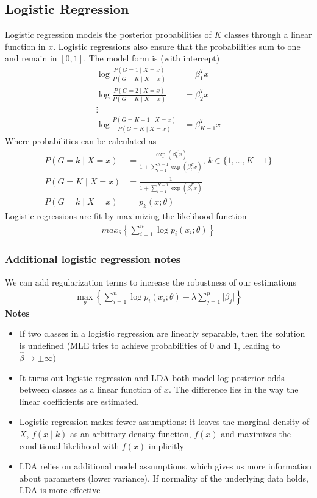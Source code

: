\documentclass{article}
\newcommand{\abs}[1]{\lvert#1\rvert}
\begin{document}
\subsection{Logistic Regression}
Logistic regression models the posterior probabilities of $K$ classes through a linear function in $x$. Logistic regressions also ensure that the probabilities sum to one and remain in $[0,1]$. The model form is (with intercept)
\begin{align*}
  \log\frac{P(G=1 \mid X=x)}{P(G=K \mid X=x)} &= \beta_1^Tx\\
  \log\frac{P(G=2 \mid X=x)}{P(G=K \mid X=x)} &= \beta_2^Tx\\
  \vdots\\
  \log\frac{P(G=K-1 \mid X=x)}{P(G=K \mid X=x)} &= \beta_{K-1}^Tx
\end{align*}
Where probabilities can be calculated as
\begin{align*}
  P(G=k \mid X=x) &= \frac{\exp(\beta_k^Tx)}{1 + \sum_{l=1}^{K-1}\exp(\beta_l^Tx)} \textrm{, } k \in \{1, \dots, K-1\}\\
  P(G=K \mid X=x) &= \frac{1}{1 + \sum_{l=1}^{K-1}\exp(\beta_l^Tx)}\\
  P(G=k \mid X=x) &= p_k(x; \theta)
\end{align*}
Logistic regressions are fit by maximizing the likelihood function
\begin{align*}
  max_\theta \left\{\sum_{i=1}^n\log p_i(x_i;\theta)\right\}
\end{align*}

\subsubsection{Additional logistic regression notes}
We can add regularization terms to increase the robustness of our estimations
\begin{align*}
  \max_\theta \left\{\sum_{i=1}^n\log p_i(x_i;\theta) - \lambda \sum_{j=1}^p\abs{\beta_j}\right\}
\end{align*}
\textbf{Notes}
\begin{itemize}
  \item If two classes in a logistic regression are linearly separable, then the solution is undefined (MLE tries to achieve probabilities of 0 and 1, leading to $\hat{\beta} \rightarrow \pm\infty)$
  \item It turns out logistic regression and LDA both model log-posterior odds between classes as a linear function of $x$. The difference lies in the way the linear coefficients are estimated. 
  \item Logistic regression makes fewer assumptions: it leaves the marginal density of $X$, $f(x\mid k)$ as an arbitrary density function, $f(x)$ and maximizes the conditional likelihood with $f(x)$ implicitly
  \item LDA relies on additional model assumptions, which gives us more information about parameters (lower variance). If normality of the underlying data holds, LDA is more effective
\end{itemize}
\end{document}
